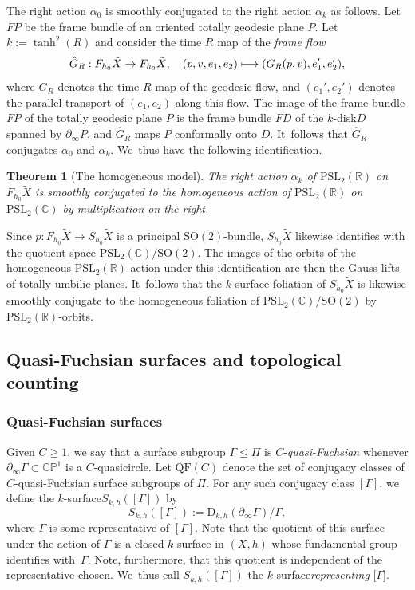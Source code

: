 \documentclass[10pt]{amsart}
\newcommand\mto{\mathchoice{\longmapsto}{\mapsto}{\mapsto}{\mapsto}}
\newcommand{\ksurface}{$k$\nobreakdash-surface\xspace}
\newcommand{\kdisk}{$k$\nobreakdash-disk\xspace}
\theoremstyle{plain}
\newtheorem{theorem}{Theorem}[section]
\theoremstyle{definition}
\newcommand\PSL{\mathrm{PSL}_2(\mathbb{R})}
\newcommand\PSLc{\mathrm{PSL}_2(\mathbb{C})}
\newcommand{\C}{{\mathbb C}}
\newcommand{\PP}{{\mathbb P}}
\let\dans\subset
\newcommand{\QF}{\mathrm{QF}}
\newcommand{\rD}{\mathrm{D}}
\newcommand{\bord}{\partial_{\infty}}
\let\Subsection\subsection\let\Subsubsection\subsubsection
\begin{document}
The right action $\alpha_0$ is smoothly conjugated to the right action $\alpha_k$ as follows. Let $FP$ be the frame bundle of an oriented totally geodesic plane $P$. Let $k:=\tanh^2(R)$ and consider the time $R$ map of the \emph{frame flow}
\[
\hat G_R:F_{h_0}\tilde X\to F_{h_0}\tilde X,\quad(p,v,e_1,e_2)\mto(G_R(p,v),e_1',e_2'),
\]
where $G_R$ denotes the time $R$ map of the geodesic flow, and $(e_1',e_2')$ denotes the parallel transport of $(e_1,e_2)$ along this flow. The image of the frame bundle $FP$ of the totally geodesic plane $P$ is the frame bundle $FD$ of the \kdisk $D$ spanned by $\bord P$, and $\hat G_R$ maps $P$ conformally onto $D$. It~follows that $\hat G_R$ conjugates $\alpha_0$ and $\alpha_k$. We~thus have the following identification.

\begin{theorem}[The homogeneous model]\label{t.homogeneous_model}
The right action $\alpha_k$ of $\PSL$ on $F_{h_0}\tilde{X}$ is smoothly conjugated to the homogeneous action of $\PSL$ on $\PSLc$ by multiplication on the right.
\end{theorem}

Since $p:F_{h_0}\tilde{X}\to S_{h_0}\tilde{X}$ is a principal $\text{SO}(2)$-bundle, $S_{h_0}\tilde{X}$ likewise identifies with the quotient space $\PSLc/\text{SO}(2)$. The images of the orbits of the homogeneous $\PSL$-action under this identification are then the Gauss lifts of totally umbilic planes. It~follows that the \ksurface foliation of $S_{h_0}\tilde{X}$ is likewise smoothly conjugate to the homogeneous foliation of $\PSLc/\text{SO}(2)$ by $\PSL$-orbits.

\Subsection{Quasi-Fuchsian surfaces and topological counting}

\subsubsection{Quasi-Fuchsian surfaces} Given $C\geq 1$, we say that a surface subgroup \hbox{$\Gamma\leq\Pi$} is $C$-\emph{quasi-Fuchsian} whenever $\partial_\infty\Gamma\dans\C\PP^1$ is a $C$-quasicircle. Let $\QF(C)$ denote the set of conjugacy classes of $C$-quasi-Fuchsian surface subgroups of $\Pi$. For any such conjugacy class $[\Gamma]$, we define the \ksurface $S_{k,h}([\Gamma])$ by
\begin{equation}\label{eq.rep_surface}
S_{k,h}([\Gamma]):=\rD_{k,h}(\partial_\infty\Gamma)/\Gamma,
\end{equation}
where $\Gamma$ is some representative of $[\Gamma]$. Note that the quotient of this surface under the action of $\Gamma$ is a closed \ksurface in $(X,h)$ whose fundamental group identifies with~$\Gamma$. Note, furthermore, that this quotient is independent of the representative chosen. We~thus call $S_{k,h}([\Gamma])$ the \ksurface \emph{representing} $[\Gamma$].
\end{document}
